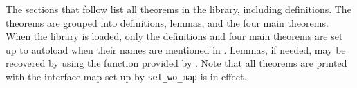 \label{theorems}

The sections that follow list all theorems in the  library,
including definitions. The theorems are grouped into definitions, lemmas, and
the four main theorems. When the  library is loaded, only the
definitions and four main theorems are set up to autoload when their names are
mentioned in \ML. Lemmas, if needed, may be recovered by using the
 function provided by \ML. Note that all theorems are printed with
the interface map set up by {\tt set\_wo\_map} is in effect.
